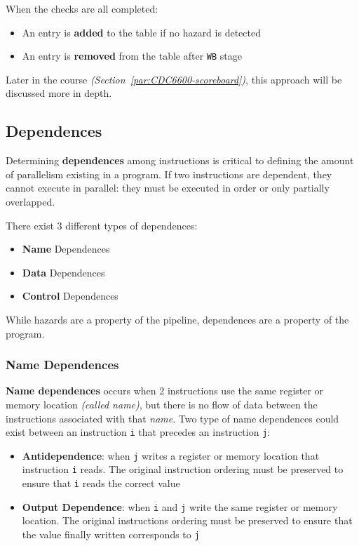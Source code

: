 \documentclass[english]{article}
\begin{document}
When the checks are all completed:

\begin{itemize}
  \item An entry is \textbf{added} to the table if no hazard is detected
  \item An entry is \textbf{removed} from the table after \texttt{WB} stage
\end{itemize}

\bigskip
Later in the course \textit{(Section~\ref{par:CDC6600-scoreboard})}, this approach will be discussed more in depth.

\subsection{Dependences}

Determining \textbf{dependences} among instructions is critical to defining the amount of parallelism existing in a program.
If two instructions are dependent, they cannot execute in parallel: they must be executed in order or only partially overlapped.

There exist 3 different types of dependences:

\begin{itemize}
  \item \textbf{Name} Dependences
  \item \textbf{Data} Dependences
  \item \textbf{Control} Dependences
\end{itemize}

While hazards are a property of the pipeline, dependences are a property of the program.

\subsubsection{Name Dependences}

\textbf{Name dependences} occurs when 2 instructions use the same register or memory location \textit{(called name)}, but there is no flow of data between the instructions associated with that \textit{name}.
Two type of name dependences could exist between an instruction \texttt{i} that precedes an instruction \texttt{j}:

\begin{itemize}
  \item \textbf{Antidependence}: when \texttt{j} writes a register or memory location that instruction \texttt{i} reads. The original instruction ordering must be preserved to ensure that \texttt{i} reads the correct value
  \item \textbf{Output Dependence}: when \texttt{i} and \texttt{j} write the same register or memory location. The original instructions ordering must be preserved to ensure that the value finally written corresponds to \texttt{j}
\end{itemize}
\end{document}
